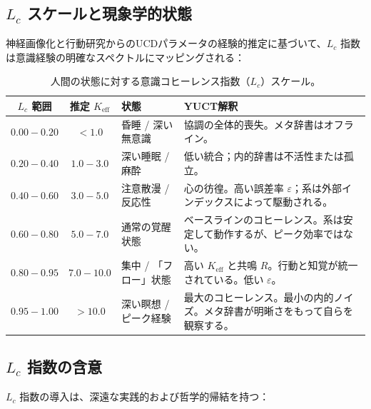 \documentclass[12pt,a4paper]{article}
\begin{document}
	\subsection{\(L_c\) スケールと現象学的状態}
	
	神経画像化と行動研究からのUCDパラメータの経験的推定に基づいて、\(L_c\) 指数は意識経験の明確なスペクトルにマッピングされる：
	
	\begin{table}[H]
		\centering
		\caption{人間の状態に対する意識コヒーレンス指数（\(L_c\)）スケール。}
		\label{tab:Lc-scale}
		\begin{tabular}{c c l p{6cm}}
			\toprule
			\textbf{\(L_c\) 範囲} & \textbf{推定 \(K_{\mathrm{eff}}\)} & \textbf{状態} & \textbf{YUCT解釈} \\
			\midrule
			\(0.00 - 0.20\) & \(< 1.0\) & 昏睡 / 深い無意識 & 協調の全体的喪失。メタ辞書はオフライン。 \\
			\(0.20 - 0.40\) & \(1.0 - 3.0\) & 深い睡眠 / 麻酔 & 低い統合；内的辞書は不活性または孤立。 \\
			\(0.40 - 0.60\) & \(3.0 - 5.0\) & 注意散漫 / 反応性 & 心の彷徨。高い誤差率 \(\varepsilon\)；系は外部インデックスによって駆動される。 \\
			\(0.60 - 0.80\) & \(5.0 - 7.0\) & 通常の覚醒状態 & ベースラインのコヒーレンス。系は安定して動作するが、ピーク効率ではない。 \\
			\(0.80 - 0.95\) & \(7.0 - 10.0\) & 集中 / 「フロー」状態 & 高い \(K_{\mathrm{eff}}\) と共鳴 \(R\)。行動と知覚が統一されている。低い \(\varepsilon\)。 \\
			\(0.95 - 1.00\) & \(> 10.0\) & 深い瞑想 / ピーク経験 & 最大のコヒーレンス。最小の内的ノイズ。メタ辞書が明晰さをもって自らを観察する。 \\
			\bottomrule
		\end{tabular}
	\end{table}
	
	\subsection{\(L_c\) 指数の含意}
	
	\(L_c\) 指数の導入は、深遠な実践的および哲学的帰結を持つ：
	
\end{document}
